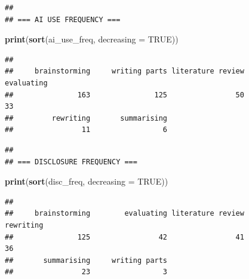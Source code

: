 \documentclass[
]{article}
\newenvironment{Shaded}{\begin{snugshade}}{\end{snugshade}}
\newcommand{\AttributeTok}[1]{\textcolor[rgb]{0.13,0.29,0.53}{#1}}
\newcommand{\CommentTok}[1]{\textcolor[rgb]{0.56,0.35,0.01}{\textit{#1}}}
\newcommand{\ConstantTok}[1]{\textcolor[rgb]{0.56,0.35,0.01}{#1}}
\newcommand{\FunctionTok}[1]{\textcolor[rgb]{0.13,0.29,0.53}{\textbf{#1}}}
\newcommand{\NormalTok}[1]{#1}
\newcommand{\OtherTok}[1]{\textcolor[rgb]{0.56,0.35,0.01}{#1}}
\newcommand{\SpecialCharTok}[1]{\textcolor[rgb]{0.81,0.36,0.00}{\textbf{#1}}}
\newcommand{\StringTok}[1]{\textcolor[rgb]{0.31,0.60,0.02}{#1}}
\begin{document}
\begin{verbatim}
## 
## === AI USE FREQUENCY ===
\end{verbatim}

\begin{Shaded}
\begin{Highlighting}[]
\FunctionTok{print}\NormalTok{(}\FunctionTok{sort}\NormalTok{(ai\_use\_freq, }\AttributeTok{decreasing =} \ConstantTok{TRUE}\NormalTok{))}
\end{Highlighting}
\end{Shaded}

\begin{verbatim}
## 
##     brainstorming     writing parts literature review        evaluating 
##               163               125                50                33 
##         rewriting       summarising 
##                11                 6
\end{verbatim}

\begin{Shaded}
\end{Shaded}

\begin{verbatim}
## 
## === DISCLOSURE FREQUENCY ===
\end{verbatim}

\begin{Shaded}
\begin{Highlighting}[]
\FunctionTok{print}\NormalTok{(}\FunctionTok{sort}\NormalTok{(disc\_freq, }\AttributeTok{decreasing =} \ConstantTok{TRUE}\NormalTok{))}
\end{Highlighting}
\end{Shaded}

\begin{verbatim}
## 
##     brainstorming        evaluating literature review         rewriting 
##               125                42                41                36 
##       summarising     writing parts 
##                23                 3
\end{verbatim}
\end{document}
